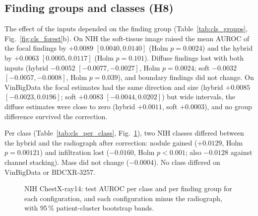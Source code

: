\subsection{Finding groups and classes (H8)}
The effect of the inputs depended on the finding group (Table~\ref{tab:cls_groups}, Fig.~\ref{fig:cls_forest}b). On NIH the soft-tissue
image raised the mean AUROC of the focal findings by $+0.0089$ $[0.0040,0.0140]$ (Holm $p=0.0024$) and the hybrid by $+0.0063$
$[0.0005,0.0117]$ (Holm $p=0.101$). Diffuse findings lost with both inputs (hybrid $-0.0052$ $[-0.0077,-0.0027]$, Holm $p=0.0024$; soft
$-0.0032$ $[-0.0057,-0.0008]$, Holm $p=0.039$), and boundary findings did not change. On VinBigData the focal estimates had the same direction
and size (hybrid $+0.0085$ $[-0.0023,0.0196]$; soft $+0.0083$ $[-0.0044,0.0202]$) but wide intervals, the diffuse estimates were close to
zero (hybrid $+0.0011$, soft $+0.0003$), and no group difference survived the correction.

\begin{table}[htbp]
\centering\footnotesize
\caption{H8: difference in the mean per-class AUROC of each finding group, with 95\,\% cluster-bootstrap intervals; Holm within dataset over
groups and contrasts.}
\label{tab:cls_groups}
\end{table}

Per class (Table~\ref{tab:cls_per_class}, Fig.~\ref{fig:cls_per_class}), two NIH classes differed between the hybrid and the
radiograph after correction: nodule gained ($+0.0129$, Holm $p=0.00121$) and infiltration lost ($-0.0160$, Holm $p<0.001$; also $-0.0128$
against channel stacking). Mass did not change ($-0.0004$). No class differed on VinBigData or BDCXR-3257.

\begin{table}[htbp]
\centering\footnotesize
\caption{H8 per class: test AUROC of the radiograph and hybrid seed ensembles and the paired DeLong contrasts of the hybrid against the
radiograph and against channel stacking; Holm within dataset over classes and both contrasts.}
\label{tab:cls_per_class}
\end{table}

\begin{figure}[htbp]
\centering
{}
\caption{NIH ChestX-ray14: test AUROC per class and per finding group for each configuration, and each configuration minus the radiograph,
with 95\,\% patient-cluster bootstrap bands.}
\label{fig:cls_per_class}
\end{figure}

